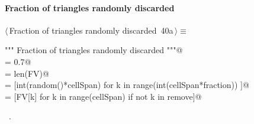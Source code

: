 \documentclass[11pt,oneside]{article}	%
\begin{document}
\paragraph{Fraction of triangles randomly discarded}
\begin{flushleft} \small \label{scrap63}
\protect{}$\langle\,$Fraction of triangles randomly discarded\nobreak\ {\footnotesize 40a}$\,\rangle\equiv$
\vspace{-1ex}
\begin{list}{}{} \item
\mbox{}\verb@""" Fraction of triangles randomly discarded """@\\
\mbox{}\verb@fraction = 0.7@\\
\mbox{}\verb@cellSpan = len(FV)@\\
\mbox{}\verb@remove = [int(random()*cellSpan) for k in range(int(cellSpan*fraction)) ]@\\
\mbox{}\verb@FV = [FV[k] for k in range(cellSpan) if not k in remove]@\\
\mbox{}\verb@@{\NWsep}
\end{list}
\vspace{-1ex}
\footnotesize\addtolength{\baselineskip}{-1ex}
\begin{list}{}{\setlength{\itemsep}{-\parsep}\setlength{\itemindent}{-\leftmargin}}
\item \NWtxtMacroRefIn\ .
\end{list}
\end{flushleft}
\end{document}
